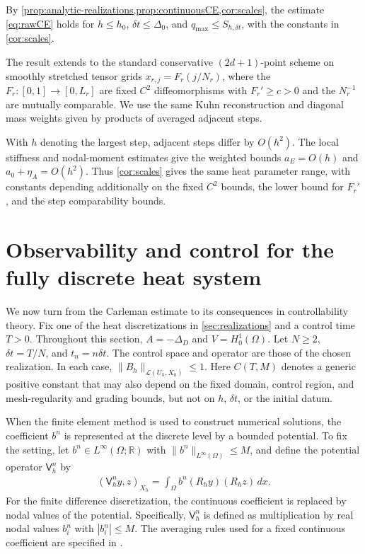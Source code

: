 \documentclass[print,wide,eng]{draft}
\begin{document}
By \cref{prop:analytic-realizations,prop:continuousCE,cor:scales}, the estimate \cref{eq:rawCE} holds for $h\leq h_0$, ${\delta t}\leq \Delta_0$, and $q_{\max}\leq S_{h,{\delta t}}$, with the constants in \cref{cor:scales}.

\begin{remark}\label{rem:general-fd}
The result extends to the standard conservative $(2d+1)$-point scheme on smoothly stretched tensor grids $x_{r,j}=F_r(j/N_r)$, where the $F_r:[0,1]\to[0,L_r]$ are fixed $C^2$ diffeomorphisms with $F_r'\geq c>0$ and the $N_r^{-1}$ are mutually comparable. We use the same Kuhn reconstruction and diagonal mass weights given by products of averaged adjacent steps.

With $h$ denoting the largest step, adjacent steps differ by $O(h^2)$. The local stiffness and nodal-moment estimates give the weighted bounds $a_E=O(h)$ and $a_0+\eta_A=O(h^2)$. Thus \cref{cor:scales} gives the same heat parameter range, with constants depending additionally on the fixed $C^2$ bounds, the lower bound for $F_r'$, and the step comparability bounds.
\end{remark}
%

\section{Observability and control for the fully discrete heat system}\label{sec:control}

We now turn from the Carleman estimate to its  consequences in controllability theory. Fix one of the heat discretizations in \cref{sec:realizations} and a control time $T>0$. Throughout this section, $A=-\Delta_D$ and $V=H_0^1(\Omega)$. Let $N\geq2$, ${\delta t}=T/N$, and $t_n=n{\delta t}$. The control space and operator are those of the chosen realization. In each case, $\|B_h\|_{\mathcal L(U_h,X_h)}\leq1$.
Here $C(T,M)$ denotes a generic positive constant that may also depend on the fixed domain, control region, and mesh-regularity and grading bounds, but not on $h$, $\delta t$, or the initial datum.

When the finite element method is used to construct numerical solutions, the coefficient $b^n$ is represented at the discrete level by a bounded potential. To fix the setting, let $b^n\in L^\infty(\Omega;\mathbb R)$ with $\|b^n\|_{L^\infty(\Omega)}\le M$, and define the potential operator $\mathsf V_h^n$ by
%
\begin{align*}
(\mathsf V_h^ny,z)_{X_h}=\int_\Omega b^n(R_hy)(R_hz)\,dx.
\end{align*}
%
For the finite difference discretization, the continuous coefficient is replaced by nodal values of the potential. Specifically, $\mathsf V_h^n$ is defined as multiplication by real nodal values $b_i^n$ with $|b_i^n|\le M$.
The averaging rules used for a fixed continuous coefficient are specified in .
\end{document}

